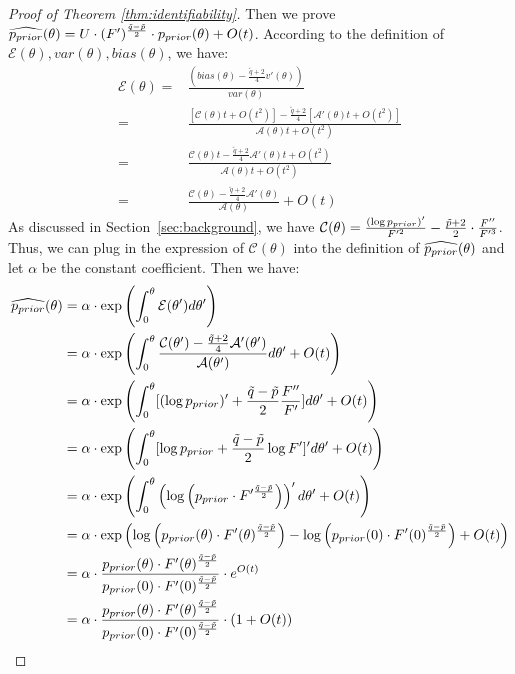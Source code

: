 \begin{proof}[Proof of Theorem \ref{thm:identifiability}]
Then we prove $\widehat{p_{prior}}(\theta) = U \cdot (F')^{\frac{\tilde{q}-\tilde{p}}{2}} \cdot p_{prior}(\theta) + O(t)$.
According to the definition of $\mathcal{E}(\theta), var(\theta), bias(\theta)$, we have:
\begin{align*}
\mathcal{E}(\theta) =& \frac{(bias(\theta) - \frac{\tilde{q}+2}{4} v'(\theta))}{var(\theta)} \\
= & \frac{[\mathcal{C}(\theta)t+O(t^2)] - \frac{\tilde{q}+2}{4}[\mathcal{A}'(\theta)t + O(t^2)]}{\mathcal{A}(\theta)t + O(t^2)} \\
= & \frac{\mathcal{C}(\theta)t - \frac{\tilde{q}+2}{4}\mathcal{A}'(\theta)t + O(t^2)}{\mathcal{A}(\theta)t + O(t^2)} \\
= & \frac{\mathcal{C}(\theta)-\frac{\tilde{q}+2}{4}\mathcal{A}'(\theta)}{\mathcal{A}(\theta)} + O(t)
\end{align*}
As discussed in Section~\ref{sec:background}, we have $\mathcal{C}(\theta) = \frac{(\log p_{prior})'}{F'^2}-\frac{\tilde{p}+2}{2}\cdot\frac{F''}{F'^3}$. Thus, we can plug in the expression of $\mathcal{C}(\theta)$ into the definition of $\widehat{p_{prior}}(\theta)$ and let $\alpha$ be the constant coefficient. Then we have:
\begin{align*}
    \widehat{\Prior}(\theta) &= \alpha \cdot \exp \left({\int_0^\theta \mathcal{E}(\theta') d\theta'}\right)\\
    &= \alpha \cdot \exp\left(\int_0^\theta \frac{\mathcal{C}(\theta')-\frac{\tilde{q}+2}{4}\mathcal{A}'(\theta')}{\mathcal{A}(\theta')}d\theta' + O(t)\right)\\
    &= \alpha \cdot \exp \left(\int_0^\theta [(\log \Prior)' + \frac{\tilde{q}-\tilde{p}}{2}\frac{F''}{F'}] d\theta' + O(t)\right)\\
    &= \alpha \cdot \exp \left(\int_0^\theta [\log \Prior + \frac{\tilde{q}-\tilde{p}}{2}\log F']' d\theta' + O(t)\right)\\
    &= \alpha \cdot \exp \left(\int_0^\theta \left( \log \left( \Prior \cdot F'^{\frac{\tilde{q}-\tilde{p}}{2}} \right) \right)' d\theta' + O(t)\right)\\
    &= \alpha \cdot \exp \left( \log \left( \Prior(\theta) \cdot F'(\theta)^{\frac{\tilde{q}-\tilde{p}}{2}} \right) - \log \left( \Prior(0) \cdot F'(0)^{\frac{\tilde{q}-\tilde{p}}{2}} \right) + O(t) \right)\\
    &= \alpha \cdot \frac{\Prior(\theta) \cdot F'(\theta)^{\frac{\tilde{q}-\tilde{p}}{2}}}{\Prior(0) \cdot F'(0)^{\frac{\tilde{q}-\tilde{p}}{2}}} \cdot e^{O(t)}\\
    &= \alpha \cdot \frac{\Prior(\theta) \cdot F'(\theta)^{\frac{\tilde{q}-\tilde{p}}{2}}}{\Prior(0) \cdot F'(0)^{\frac{\tilde{q}-\tilde{p}}{2}}} \cdot (1+O(t))\\

\end{align*}
\end{proof}
